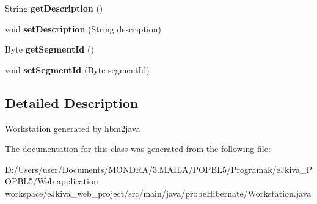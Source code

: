 \begin{DoxyCompactItemize}
\mbox{\label{classprobe_hibernate_1_1_workstation_a766798013be354e7198341087c1f0cf8}} 
String {\bfseries get\+Description} ()
\item 
\mbox{\label{classprobe_hibernate_1_1_workstation_a4f4e950cff5d4630346f54f52da5f37e}} 
void {\bfseries set\+Description} (String description)
\item 
\mbox{\label{classprobe_hibernate_1_1_workstation_ac48e0c0e85826e28b7d077c61b019cf1}} 
Byte {\bfseries get\+Segment\+Id} ()
\item 
\mbox{\label{classprobe_hibernate_1_1_workstation_a8d806479c357b27d8161ff72707d5aff}} 
void {\bfseries set\+Segment\+Id} (Byte segment\+Id)
\end{DoxyCompactItemize}


\subsection{Detailed Description}
\mbox{\hyperlink{classprobe_hibernate_1_1_workstation}{Workstation}} generated by hbm2java 

The documentation for this class was generated from the following file\+:\begin{DoxyCompactItemize}
\item 
D\+:/\+Users/user/\+Documents/\+M\+O\+N\+D\+R\+A/3.\+M\+A\+I\+L\+A/\+P\+O\+P\+B\+L5/\+Programak/e\+Jkiva\+\_\+\+P\+O\+P\+B\+L5/\+Web application workspace/e\+Jkiva\+\_\+web\+\_\+project/src/main/java/probe\+Hibernate/Workstation.\+java\end{DoxyCompactItemize}
